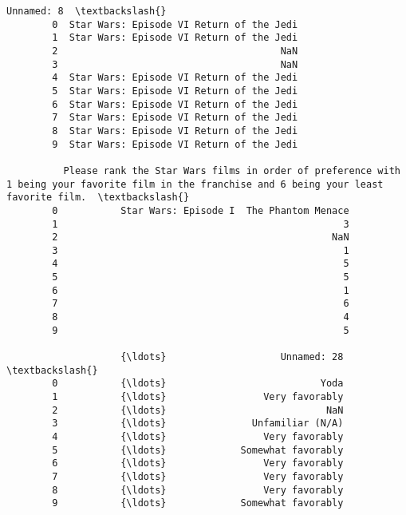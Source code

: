 \documentclass[11pt]{article}
\begin{document}
\begin{Verbatim}[commandchars=\\\{\}]
                                         Unnamed: 8  \textbackslash{}
        0  Star Wars: Episode VI Return of the Jedi   
        1  Star Wars: Episode VI Return of the Jedi   
        2                                       NaN   
        3                                       NaN   
        4  Star Wars: Episode VI Return of the Jedi   
        5  Star Wars: Episode VI Return of the Jedi   
        6  Star Wars: Episode VI Return of the Jedi   
        7  Star Wars: Episode VI Return of the Jedi   
        8  Star Wars: Episode VI Return of the Jedi   
        9  Star Wars: Episode VI Return of the Jedi   
        
          Please rank the Star Wars films in order of preference with 1 being your favorite film in the franchise and 6 being your least favorite film.  \textbackslash{}
        0           Star Wars: Episode I  The Phantom Menace                                                                                              
        1                                                  3                                                                                              
        2                                                NaN                                                                                              
        3                                                  1                                                                                              
        4                                                  5                                                                                              
        5                                                  5                                                                                              
        6                                                  1                                                                                              
        7                                                  6                                                                                              
        8                                                  4                                                                                              
        9                                                  5                                                                                              
        
                    {\ldots}                    Unnamed: 28  \textbackslash{}
        0           {\ldots}                           Yoda   
        1           {\ldots}                 Very favorably   
        2           {\ldots}                            NaN   
        3           {\ldots}               Unfamiliar (N/A)   
        4           {\ldots}                 Very favorably   
        5           {\ldots}             Somewhat favorably   
        6           {\ldots}                 Very favorably   
        7           {\ldots}                 Very favorably   
        8           {\ldots}                 Very favorably   
        9           {\ldots}             Somewhat favorably   
        

\end{Verbatim}
\end{document}

